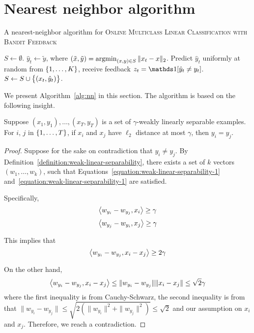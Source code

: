 \section{Nearest neighbor algorithm}
\begin{algorithm}
\caption{A nearest-neighbor algorithm for \textsc{Online Multiclass Linear Classification with
Bandit Feedback}}
\begin{algorithmic}[1]
\STATE $S \gets \emptyset$.
	\STATE $\hat{y}_t \gets \tilde{y}$, where $(\tilde{x}, \tilde{y}) = \operatorname*{argmin}_{(x,y) \in S} \| x_t - x \|_2$.
\ELSE
	\STATE Predict $\hat{y}_t$ uniformly at random from $\cbr{1,\ldots,K}$, receive feedback $z_t = \one[\hat{y}_t \neq y_t]$.
  \label{line:nn-explore}
    \STATE $S \gets S \cup \cbr{(x_t, \hat{y}_t)}$.
  \ENDIF
\ENDIF
\ENDFOR
\end{algorithmic}
\label{alg:nn}
\end{algorithm}

We present Algorithm~\ref{alg:nn} in this section. The algorithm is based on the following insight.

\begin{lemma}
Suppose $(x_1,y_1), \ldots, (x_T, y_T)$ is a set of $\gamma$-weakly linearly separable examples.
For $i$, $j$ in $\cbr{1,\ldots,T}$, if $x_i$ and $x_j$ have $\ell_2$ distance at most $\gamma$, then $y_i = y_j$.
\label{lem:nn}
\end{lemma}
\begin{proof}
Suppose for the sake on contradiction that $y_i \neq y_j$. By Definition~\ref{definition:weak-linear-separability}, there exists a set of $k$ vectors $(w_1, \ldots, w_k)$, such that Equations~\eqref{equation:weak-linear-separability-1}
and~\eqref{equation:weak-linear-separability-1} are satisfied.

Specifically,
\[ \left\langle w_{y_i} - w_{y_j}, x_i \right\rangle \geq \gamma \]
\[ \left\langle w_{y_j} - w_{y_i}, x_j \right\rangle \geq \gamma \]

This implies that
\[ \left\langle w_{y_i} - w_{y_j}, x_i - x_j \right\rangle \geq 2\gamma \]

On the other hand,
\[ \left\langle w_{y_i} - w_{y_j}, x_i - x_j \right\rangle \leq \| w_{y_i} - w_{y_j} \| \| x_i - x_j \| \leq \sqrt{2} \gamma \]
where the first inequality is from Cauchy-Schwarz,
the second inequality is from that
$\|w_{y_i} - w_{y_j}\| \leq \sqrt{2(\|w_{y_i}\|^2 + \|w_{y_j}\|^2)} \leq \sqrt{2}$ and our assumption
on $x_i$ and $x_j$. Therefore, we reach a contradiction.
\end{proof}


